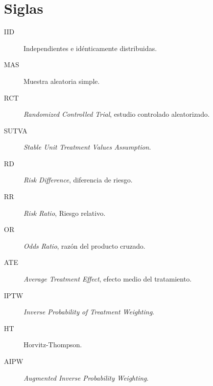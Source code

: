 \section*{Siglas}
\begin{description}
    \item[IID] Independientes e idénticamente distribuidas.
    \item[MAS] Muestra aleatoria simple.
    \item[RCT] \textit{Randomized Controlled Trial}, estudio controlado aleatorizado.
    \item[SUTVA] \textit{Stable Unit Treatment Values Assumption}.
    \item[RD] \textit{Risk Difference}, diferencia de riesgo.
    \item[RR] \textit{Risk Ratio}, Riesgo relativo.
    \item[OR] \textit{Odds Ratio}, razón del producto cruzado.
    \item[ATE] \textit{Average Treatment Effect}, efecto medio del tratamiento.
    \item[IPTW] \textit{Inverse Probability of Treatment Weighting}.
    \item[HT] Horvitz-Thompson.
    \item[AIPW] \textit{Augmented Inverse Probability Weighting}.
\end{description}
\endinput
